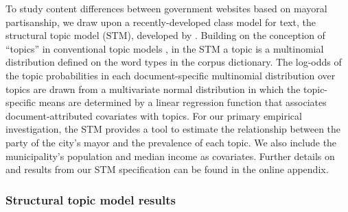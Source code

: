 \documentclass[11pt]{article}
\begin{document}
%

To study content differences between government websites based on mayoral partisanship, we draw upon a recently-developed class model for text, the structural topic model (STM), developed by \citet{Roberts2014}. Building on the conception of ``topics'' in conventional topic models \citep{valdez2018topic}, in the STM a topic is a multinomial distribution defined on the word types in the corpus dictionary. The log-odds of the topic probabilities in each document-specific multinomial distribution over topics are drawn from a multivariate normal distribution in which the topic-specific means are determined by a linear regression function that associates document-attributed covariates with topics. For our primary empirical investigation, the STM provides a tool to estimate the relationship between the party of the city's mayor and the prevalence of each topic. We also include the municipality's population and median income as covariates. Further details on and results from our STM specification can be found in the online appendix.


\subsubsection{Structural topic model results}
\end{document}
